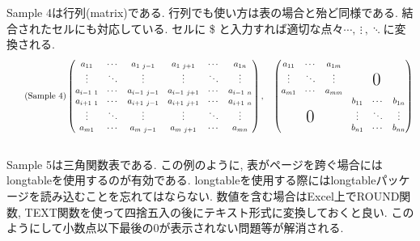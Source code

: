 \documentclass{jsarticle}
\begin{document}
Sample 4は行列(matrix)である.
行列でも使い方は表の場合と殆ど同様である.
結合されたセルにも対応している.
セルに \$ と入力すれば適切な点々$\cdots,\  \vdots\ , \ddots$に変換される.
\begin{align}
	\tag{Sample 4}
	\begin{pmatrix}
		a_{11}	&\cdots	&a_{1\ j-1}	&a_{1\ j+1}	&\cdots	&a_{1n}	\\
		\vdots	&\ddots	&\vdots	&\vdots	&\ddots	&\vdots	\\
		a_{i-1\ 1}	&\cdots	&a_{i-1\ j-1}	&a_{i-1\ j+1}	&\cdots	&a_{i-1\ n}	\\
		a_{i+1\ 1}	&\cdots	&a_{i+1\ j-1}	&a_{i+1\ j+1}	&\cdots	&a_{i+1\ n}	\\
		\vdots	&\ddots	&\vdots	&\vdots	&\ddots	&\vdots	\\
		a_{m1}	&\cdots	&a_{m\ j-1}	&a_{m\ j+1}	&\cdots	&a_{mn}
	\end{pmatrix}, \quad
	\begin{pmatrix}
		a_{11}	&\cdots	&a_{1m}	&\multicolumn{3}{c}{\multirow{3}{*}{$\hspace{-0.4em}\raisebox{-1.5em}{\text{\huge0}}$}}	\\
		\vdots	&\ddots	&\vdots	&\multicolumn{3}{c}{}	\\
		a_{m1}	&\cdots	&a_{mm}	&\multicolumn{3}{c}{}	\\
		\multicolumn{3}{c}{\multirow{3}{*}{$\hspace{-0.4em}\raisebox{-1.5em}{\text{\huge0}}$}}	&b_{11}	&\cdots	&b_{1n}	\\
		\multicolumn{3}{c}{}	&\vdots	&\ddots	&\vdots	\\
		\multicolumn{3}{c}{}	&b_{n1}	&\cdots	&b_{nn}
	\end{pmatrix}
\end{align}
\\

Sample 5は三角関数表である.
この例のように, 表がページを跨ぐ場合にはlongtableを使用するのが有効である.
longtableを使用する際にはlongtableパッケージを読み込むことを忘れてはならない.
数値を含む場合はExcel上でROUND関数, TEXT関数を使って四捨五入の後にテキスト形式に変換しておくと良い.
このようにして小数点以下最後の0が表示されない問題等が解消される.
\end{document}
